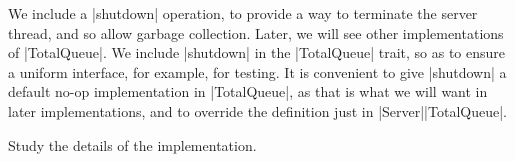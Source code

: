 

We include a |shutdown| operation, to provide a way to terminate the server
thread, and so allow garbage collection.  Later, we will see other
implementations of |TotalQueue|.  We include |shutdown| in the |TotalQueue|
trait, so as to ensure a uniform interface, for example, for testing.  It is
convenient to give |shutdown| a default no-op implementation in |TotalQueue|,
as that is what we will want in later implementations, and to override the
definition just in |Server|\-|TotalQueue|.

\begin{instruction}
Study the details of the implementation.
\end{instruction}


